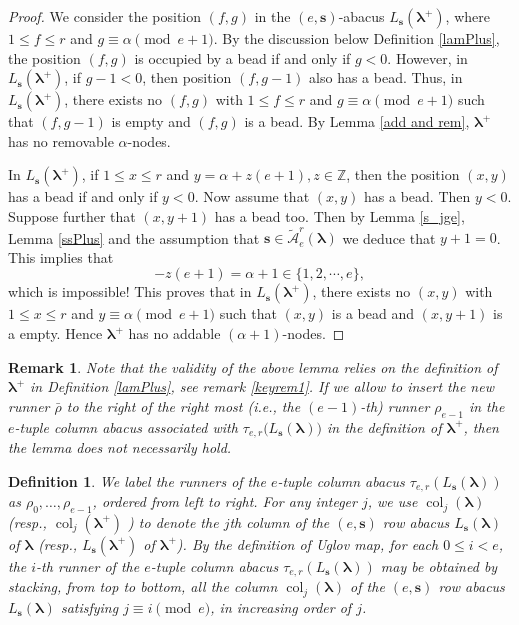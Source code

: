 \documentclass[a4paper,10pt]{amsart}
\theoremstyle{plain}
\def\bs{{\boldsymbol{s}}}
\def\blam{{\boldsymbol \lambda}}
\DeclareMathOperator{\col}{col}
\theoremstyle{plain}
\newtheorem{definition}[theorem]{Definition}
\newtheorem{remark}[theorem]{Remark}
\numberwithin{equation}{section}
\begin{document}
\begin{proof} We consider the position $(f, g)$ in the $(e,\mathbf{s})$-abacus $L_\mathbf{s}(\boldsymbol{\lambda}^+)$, where $1 \le f \le r$ and $g \equiv \alpha \pmod{e+1}$. By the discussion below Definition \ref{lamPlus}, the position $(f, g)$ is occupied by a bead if and only if $g < 0$. However, in $L_\mathbf{s}(\boldsymbol{\lambda}^+)$, if $g-1 < 0$, then position $(f, g-1)$ also has a bead. Thus, in $L_\mathbf{s}(\boldsymbol{\lambda}^+)$, there exists no $(f, g)$ with $1 \le f \le r$ and $g \equiv\alpha\pmod{e+1}$ such that $(f, g-1)$ is empty and $(f, g)$ is a bead. By Lemma \ref{add and rem}, $\boldsymbol{\lambda}^+$ has no removable $\alpha$-nodes.

In $L_\mathbf{s}(\blam^+)$, if $1 \le x \le r$ and $y=\alpha+z(e+1), z\in \mathbb Z$, then the position $(x, y)$ has a bead if and only if $y < 0$. Now assume that $(x, y)$ has a bead. Then $y< 0$. Suppose further that $(x, y+1)$ has a bead too. Then by Lemma \ref{s_jge}, Lemma \ref{ssPlus} and the assumption that  \(\boldsymbol{s} \in \widetilde{\mathcal A}^r_e (\boldsymbol{\lambda})\) we deduce that $y+1=0$. This implies that $$
-z(e+1)=\alpha+1\in\{1,2,\cdots,e\},
$$
which is impossible! This proves that in $L_\mathbf{s}(\boldsymbol{\lambda}^+)$, there exists no $(x, y)$ with $1 \le x \le r$ and $y \equiv \alpha \pmod{e+1}$ such that $(x, y)$ is a bead and $(x, y+1)$ is a empty. Hence $\boldsymbol{\lambda}^+$ has no addable $(\alpha+1)$-nodes.
\end{proof}

\begin{remark}\label{keyrem2} Note that the validity of the above lemma relies on the definition of $\blam^+$ in Definition \ref{lamPlus}, see remark \ref{keyrem1}. If we allow to insert the new runner \(\bar{\rho}\) to the right of the right most (i.e., the $(e-1)$-th) runner $\rho_{e-1}$ in the $e$-tuple column abacus associated with \(\tau_{e, r}\big(L_{\boldsymbol{s}}(\boldsymbol{\lambda})\big)\) in the definition of $\blam^+$, then the lemma does not necessarily hold.
\end{remark}

\begin{definition} We label the runners of the $e$-tuple column abacus \(\tau_{e,r}(L_{\boldsymbol{s}}(\boldsymbol{\lambda}))\) as \(\rho_0,\dots,\rho_{e-1}\), ordered from left to right. For any integer $j$, we use $\col_j(\blam)$ (resp., $\col_j(\blam^+)$ ) to denote the $j$th column of the $(e,\bs)$ row abacus $L_\bs(\blam)$ of $\blam$ (resp., $L_\bs(\blam^+)$ of $\blam^+$). By the definition of Uglov map, for each $0\leq i<e$, the $i$-th runner of the $e$-tuple column abacus \(\tau_{e,r}(L_{\boldsymbol{s}}(\boldsymbol{\lambda}))\) may be obtained by stacking, from top to bottom, all the column $\col_j(\blam)$ of the $(e,\bs)$ row abacus $L_{\bs}(\boldsymbol{\lambda})$ satisfying $j\equiv i\pmod e$, in increasing order of $j$.
\end{definition}
\end{document}
